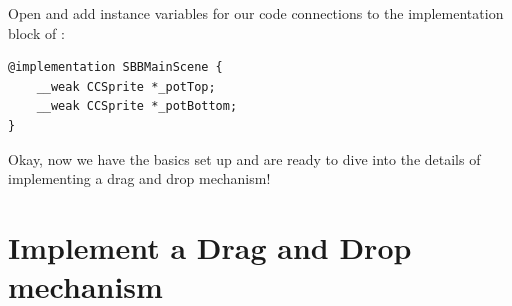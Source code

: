 \begin{leftbar}
Open  and add instance variables for our code
connections to the implementation block of :
\begin{lstlisting}
@implementation SBBMainScene {
    __weak CCSprite *_potTop;
    __weak CCSprite *_potBottom;
}
\end{lstlisting}
\end{leftbar}

Okay, now we have the basics set up and are ready to dive into the details of
implementing a drag and drop mechanism!

\section{Implement a Drag and Drop mechanism}
